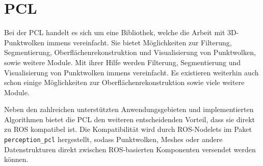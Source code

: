 \section{\acl{PCL}}
\label{sec:pcl}

Bei der \ac{PCL} \cite{rusu2011pcl} handelt es sich um eine Bibliothek, welche die Arbeit mit 3D-Punktwolken immens vereinfacht.
Sie bietet Möglichkeiten zur Filterung, Segmentierung, Oberflächenrekonstruktion und Visualisierung von Punktwolken, sowie weitere Module.
Mit ihrer Hilfe werden Filterung, Segmentierung und Visualisierung von Punktwolken immens vereinfacht.
Es existieren weiterhin auch schon einige Möglichkeiten zur Oberflächenrekonstruktion sowie viele weitere Module.

Neben den zahlreichen unterstützten Anwendungsgebieten und implementierten Algorithmen bietet die \ac{PCL} den weiteren entscheidenden Vorteil, dass sie direkt zu \ac{ROS} kompatibel ist.
Die Kompatibilität wird durch ROS-Nodelets im Paket \texttt{perception\_pcl} hergestellt, sodass Punktwolken, Meshes oder andere Datenstrukturen direkt zwischen \ac{ROS}-basierten Komponenten versendet werden können.
